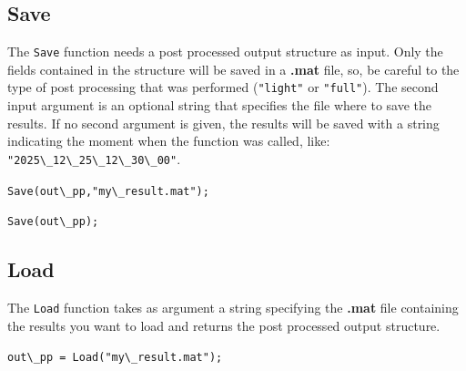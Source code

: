 \documentclass[12pt,a4paper]{article}
\newcommand{\matlabs}[1]{{\lstinline[style=MatlabStyle]!#1!}}
\begin{document}
\subsection{Save}
The \matlabs{Save} function needs a post processed output structure as input. 
Only the fields contained in the structure will be saved in a \textbf{.mat} file, so, be careful to the type of post processing that was performed (\matlabs{"light"} or \matlabs{"full"}).
The second input argument is an optional string that specifies the file where to save the results. If no second argument is given, the results will be saved with a string indicating the moment when the function was called, like: \matlabs{"2025\_12\_25\_12\_30\_00"}.

\matlabs{Save(out\_pp,"my\_result.mat");}

\matlabs{Save(out\_pp);}

\subsection{Load}
The \matlabs{Load} function takes as argument a string specifying the \textbf{.mat} file containing the results you want to load and returns the post processed output structure.

\matlabs{out\_pp = Load("my\_result.mat");}


\end{document}
